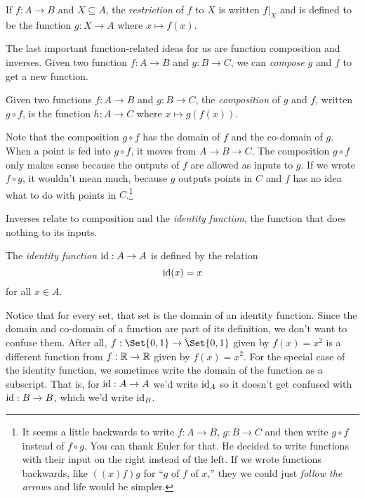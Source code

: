 	\begin{definition}[Restriction]
		If $f:A\to B$ and $X\subseteq A$, the \emph{restriction}
		of $f$ to $X$ is written 
		$f\big|_X$ and is defined to be the function $g:X\to A$ where $x\mapsto f(x)$.
	\end{definition}

	The last important function-related ideas for us are function composition and inverses.
	Given two function $f:A\to B$ and $g:B\to C$, we can \emph{compose}
	$g$ and $f$ to get a new function.
	\begin{definition}[Composition]
		Given two functions $f:A\to B$ and $g:B\to C$, the \emph{composition} of
		$g$ and $f$, written $g\circ f$, is the function $h:A\to C$ where 
		$x\mapsto g(f(x))$.
	\end{definition}
	Note that the composition $g\circ f$ has the domain of $f$ and the co-domain of $g$.
	When a point is fed into $g\circ f$, it moves from $A\to B\to C$.  The composition
	$g\circ f$ only makes sense because the outputs of $f$ are allowed as inputs to $g$.
	If we wrote $f\circ g$, it wouldn't mean much, because $g$ outputs points in $C$ and $f$
	has no idea what to do with points in $C$.\footnote{
		It seems a little backwards to write $f:A\to B$, $g:B\to C$ and then
		write $g\circ f$ instead of $f\circ g$.  You can thank Euler for that.
		He decided to write functions with their input on the right instead of
		the left.  If we wrote functions backwards, like $((x)f)g$ for ``$g$ of $f$ of $x$,''
		they we could just \emph{follow the arrows} and life would be simpler.
	}

	Inverses relate to composition and the \emph{identity function}, the function
	that does nothing to its inputs.
	\begin{definition}
		The \emph{identity function} $\operatorname{id}:A\to A$ is defined by the relation
		\[
			\operatorname{id}(x)=x
		\]
		for all $x\in A$.
	\end{definition}
	Notice that for every set, that set
	is the domain of an identity function.  Since the domain
	and co-domain of a function are part of its definition, we don't want to confuse them.
	After all, $f:\Set{0,1}\to \Set{0,1}$ given by $f(x)=x^2$ is a different function from $f:\mathbb{R}\to\mathbb{R}$
	given by $f(x)=x^2$.  For the special case of the identity function, we sometimes write
	the domain of the function as a subscript.  That is, 
	for $\operatorname{id}:A\to A$ we'd write $\operatorname{id}_A$ so it
	doesn't get confused with $\operatorname{id}:B\to B$, which we'd write $\operatorname{id}_B$.

